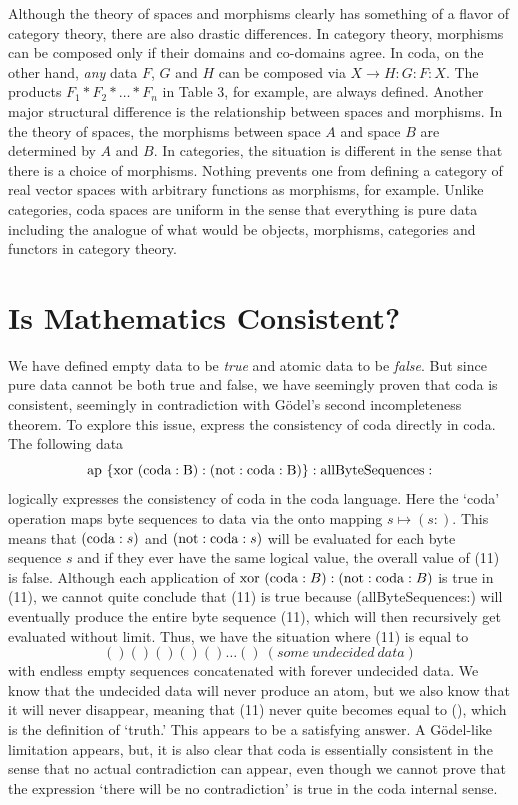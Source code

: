 \documentclass[11pt]{article}
\begin{document}
    Although the theory of spaces and morphisms clearly has something of a flavor of category theory, there are 
also drastic differences.  In category theory, morphisms can be composed only if their domains and co-domains 
agree.  In coda, on the other hand, {\it any} data $F$, $G$ and $H$ can be composed via 
$X\rightarrow H:G:F:X$.  The products $F_1*F_2*\dots *F_n$ in Table 3, 
for example, are always defined.  Another major structural difference 
is the relationship between spaces and morphisms.  In the theory of spaces, the morphisms between space 
$A$ and space $B$ are determined by $A$ and $B$.  In categories, the situation is different in the 
sense that there is a choice of morphisms.  Nothing prevents one from defining a category 
of real vector spaces with arbitrary functions as morphisms, for example.  Unlike categories, coda spaces are 
uniform in the sense that everything is pure data including the analogue of what would be objects, morphisms, 
categories and functors in category theory. 

\section{Is Mathematics Consistent?}

     We have defined empty data to be {\it true} and atomic data to be {\it false}.  But since pure data 
cannot be both true and false, we have seemingly proven that coda is consistent, seemingly 
in contradiction with G\"{o}del's second incompleteness theorem.  To explore this issue,   
express the consistency of coda directly in coda.  The following data 
\begin{equation}\label{eqn}
{\rm ap\ \{xor\ (coda:B) : (not:coda:B) \} : allByteSequences :} 
\end{equation}
logically expresses the consistency of coda in the coda language.  Here the `coda' operation maps  
byte sequences to data via the onto mapping $s\mapsto (s:)$.  This means that $({\rm coda}:s)$ and 
$({\rm not}:{\rm coda}:s)$ will be evaluated for each byte sequence $s$ and if they ever have the same logical 
value, the overall value of (11) is false.   Although each application of ${\rm xor}\ ({\rm coda}:B) : ({\rm not}:{\rm coda}:B)$ 
is true in (11), we cannot quite conclude that (11) is true because (allByteSequences:) will   
eventually produce the entire byte sequence (11), which will then recursively get evaluated 
without limit.  Thus, we have the situation where (11) is equal to 
\begin{equation}\label{eqn}
() () () () () \dots ()\  (some\ undecided\ data)
\end{equation}
with endless empty sequences concatenated with forever undecided data. 
We know that the undecided data will never produce an atom, but we also know that it will never disappear, 
meaning that (11) never quite becomes equal to (), which is the definition of `truth.'  This appears 
to be a satisfying answer.  A G\"{o}del-like limitation appears, but, it is also clear that coda 
is essentially consistent in the sense that no actual contradiction can appear, even though we 
cannot prove that the expression `there will be no contradiction' is true in the coda internal sense.
\end{document}
